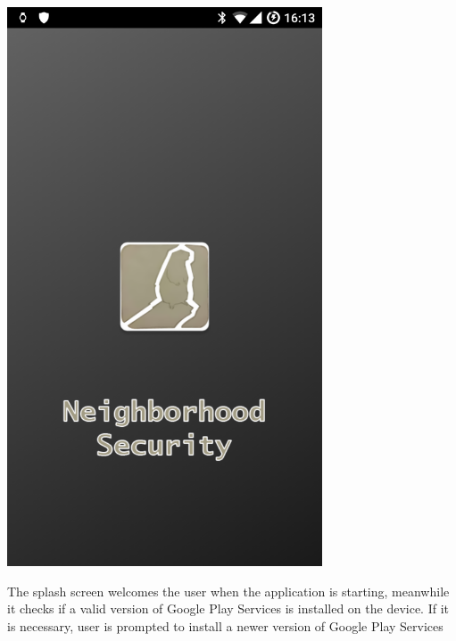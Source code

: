 \documentclass[a4paper]{scrreprt}
\begin{document}
\begin{minipage}{0.5\textwidth}
	\centering
	\includegraphics[width=0.7\textwidth]{splash}
\end{minipage}
\begin{minipage}{0.5\textwidth}
	The splash screen welcomes the user when the application is starting, meanwhile it checks if a valid version of Google Play Services is installed on the device. If it is necessary, user is prompted to install a newer version of Google Play Services
\end{minipage}
\end{document}
